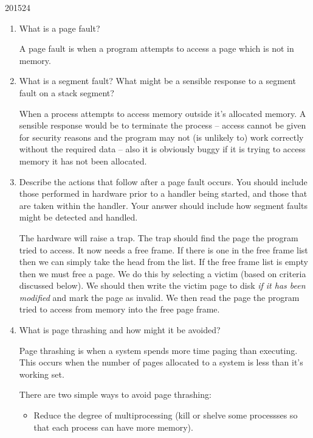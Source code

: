 \documentclass[10pt,\jkfside,a4paper]{article}
\begin{document}
\begin{examquestion}{2015}{2}{4}

\begin{enumerate}

\item What is a page fault?

A page fault is when a program attempts to access a page which is not in memory.

\item What is a segment fault? What might be a sensible response to a segment fault
on a stack segment?

When a process attempts to access memory outside it's allocated memory. A sensible response 
would be to terminate the process -- access cannot be given for security reasons and the 
program may not (is unlikely to) work correctly without the required data -- also it is 
obviously buggy if it is trying to access memory it has not been allocated.

\item Describe the actions that follow after a page fault occurs. You should include
those performed in hardware prior to a handler being started, and those that
are taken within the handler. Your answer should include how segment faults
might be detected and handled.

The hardware will raise a trap.
The trap should find the page the program tried to access.
It now needs a free frame. If there is one in the free frame list then we can simply 
take the head from the list. If the free frame list is empty then we must free a page. 
We do this by selecting a victim (based on criteria discussed below). We should then 
write the victim page to disk \textit{if it has been modified} and mark the page as invalid. 
We then read the page the program tried to access from memory into the free page frame.

\item What is page thrashing and how might it be avoided?

Page thrashing is when a system spends more time paging than executing. This occurs 
when the number of pages allocated to a system is less than it's working set.

There are two simple ways to avoid page thrashing:
\begin{itemize}

\item Reduce the degree of multiprocessing (kill or shelve some processses so that each process 
can have more memory).


\end{itemize}
\end{enumerate}
\end{examquestion}
\end{document}
